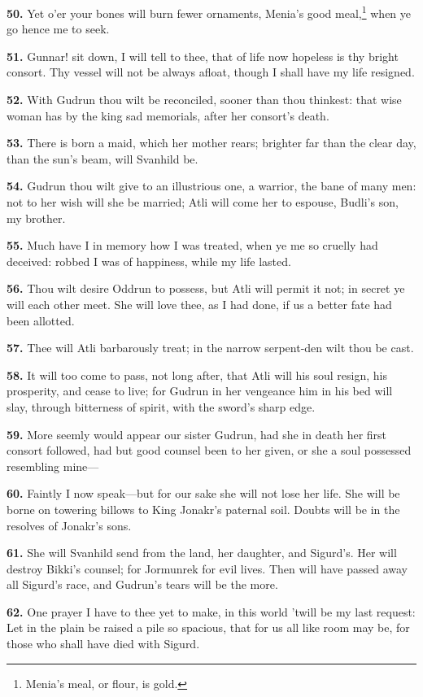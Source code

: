 \textbf{50.} Yet o'er your bones will burn fewer ornaments, Menia's good
meal,\footnote{Menia's meal, or flour, is gold.} when ye go hence me to seek.

\textbf{51.} Gunnar! sit down, I will tell to thee, that of life now hopeless
is thy bright consort. Thy vessel will not be always afloat, though I
shall have my life resigned.

\textbf{52.} With Gudrun thou wilt be reconciled, sooner than thou thinkest:
that wise woman has by the king sad memorials, after her consort's
death.

\textbf{53.} There is born a maid, which her mother rears; brighter far than
the clear day, than the sun's beam, will Svanhild be.

\textbf{54.} Gudrun thou wilt give to an illustrious one, a warrior, the bane
of many men: not to her wish will she be married; Atli will come her
to espouse, Budli's son, my brother.

\textbf{55.} Much have I in memory how I was treated, when ye me so cruelly
had deceived: robbed I was of happiness, while my life lasted.

\textbf{56.} Thou wilt desire Oddrun to possess, but Atli will permit it not;
in secret ye will each other meet. She will love thee, as I had done,
if us a better fate had been allotted.

\textbf{57.} Thee will Atli barbarously treat; in the narrow serpent-den wilt
thou be cast.

\textbf{58.} It will too come to pass, not long after, that Atli will his
soul resign, his prosperity, and cease to live; for Gudrun in her
vengeance him in his bed will slay, through bitterness of spirit, with
the sword's sharp edge.

\textbf{59.} More seemly would appear our sister Gudrun, had she in death her
first consort followed, had but good counsel been to her given, or she
a soul possessed resembling mine—

\textbf{60.} Faintly I now speak—but for our sake she will not lose her
life. She will be borne on towering billows to King Jonakr's paternal
soil. Doubts will be in the resolves of Jonakr's sons.

\textbf{61.} She will Svanhild send from the land, her daughter, and
Sigurd's. Her will destroy Bikki's counsel; for Jormunrek for evil
lives. Then will have passed away all Sigurd's race, and Gudrun's
tears will be the more.

\textbf{62.} One prayer I have to thee yet to make, in this world 'twill be
my last request: Let in the plain be raised a pile so spacious, that
for us all like room may be, for those who shall have died with
Sigurd.

